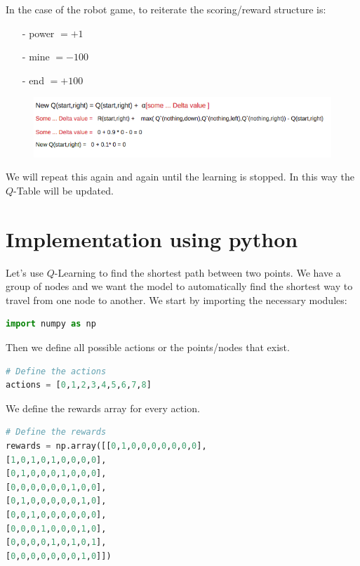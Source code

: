 In the case of the robot game, to reiterate the scoring/reward structure is:

\begin{itemize}
\setlength{\parskip}{0pt}
\item[-]
power $= +1$
\item[-]
mine $= -100$
\item[-]
end $= +100$
\end{itemize}

\begin{figure}[H]
\centering
\includegraphics[scale=0.7]{pix/q_learning/q_robot_maze_iteration.png}
\end{figure}
We will repeat this again and again until the learning is stopped. In this way 
the $Q$-Table will be updated.


%
\section{Implementation using python}
%

Let's use $Q$-Learning to find the shortest path between two points. We have a group 
of nodes and we want the model to automatically find the shortest way to travel from 
one node to another. We start by importing the necessary modules:

\begin{lstlisting}[language=Python]
import numpy as np
\end{lstlisting}

Then we define all possible actions or the points/nodes that exist.
\begin{lstlisting}[language=Python]
# Define the actions
actions = [0,1,2,3,4,5,6,7,8]
\end{lstlisting}

We define the rewards array for every action.
\begin{lstlisting}[language=Python]
# Define the rewards
rewards = np.array([[0,1,0,0,0,0,0,0,0],
[1,0,1,0,1,0,0,0,0],
[0,1,0,0,0,1,0,0,0],
[0,0,0,0,0,0,1,0,0],
[0,1,0,0,0,0,0,1,0],
[0,0,1,0,0,0,0,0,0],
[0,0,0,1,0,0,0,1,0],
[0,0,0,0,1,0,1,0,1],
[0,0,0,0,0,0,0,1,0]])
\end{lstlisting}

